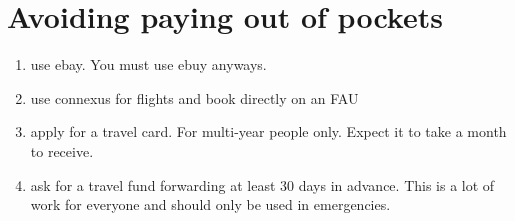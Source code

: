 \documentclass[12pt]{article}
\begin{document}
\section{Avoiding paying out of pockets}
\begin{enumerate}
\item use ebay. You must use ebuy anyways. 
\item use connexus for flights and book directly on an FAU
\item apply for a travel card. For multi-year people only. Expect it
  to take a month to receive.
\item ask for a travel fund forwarding at least 30 days in
  advance. This is a lot of work for everyone and should only be
  used in emergencies. 
\end{enumerate}
\end{document}
